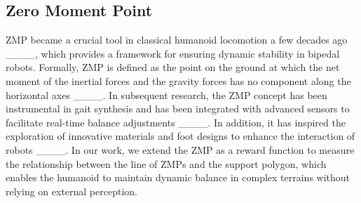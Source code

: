 \subsection{Zero Moment Point}

ZMP became a crucial tool in classical humanoid locomotion a few decades ago ____, which provides a framework for ensuring dynamic stability in bipedal robots. Formally, ZMP is defined as the point on the ground at which the net moment of the inertial forces and the gravity forces has no component along the horizontal axes ____. In subsequent research, the ZMP concept has been instrumental in gait synthesis and has been integrated with advanced sensors to facilitate real-time balance adjustments ____. In addition, it has inspired the exploration of innovative materials and foot designs to enhance the interaction of robots ____. 
In our work, we extend the ZMP as a reward function to measure the relationship between the line of ZMPs and the support polygon, which enables the humanoid to maintain dynamic balance in complex terrains without relying on external perception.